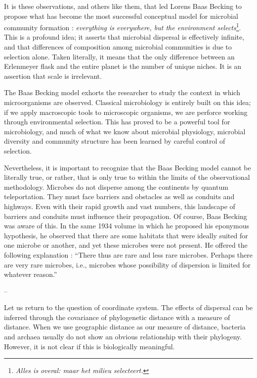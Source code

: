 It is these observations, and others like them, that led Lorens Baas Becking to propose what has become the most successful conceptual model for microbial community formation : {\em everything is everywhere, but the environment selects}\footnote{{\em Alles is overal: maar het milieu selecteert.}}. This is a profound idea; it asserts that microbial dispersal is effectively infinite, and that differences of composition among microbial communities is due to selection alone. Taken literally, it means that the only difference between an Erlenmeyer flask and the entire planet is the number of unique niches. It is an assertion that scale is irrelevant.

The Baas Becking model exhorts the researcher to study the context in which microorganisms are observed. Classical microbiology is entirely built on this idea; if we apply macroscopic tools to microscopic organisms, we are perforce working through environmental selection. This has proved to be a powerful tool for microbiology, and much of what we know about microbial physiology, microbial diversity and community structure has been learned by careful control of selection. 

Nevertheless, it is important to recognize that the Baas Becking model cannot be literally true, or rather, that is only true to within the limits of the observational methodology. Microbes do not disperse among the continents by quantum teleportation. They must face barriers and obstacles as well as conduits and highways. Even with their rapid growth and vast numbers, this landscape of barriers and conduits must influence their propagation. Of course, Baas Becking was aware of this. In the same 1934 volume in which he proposed his eponymous hypothesis, he observed that there are some habitats that were ideally suited for one microbe or another, and yet these microbes were not present. He offered the following explanation : ``There thus are rare and less rare microbes. Perhaps there are very rare microbes, i.e., microbes whose possibility of dispersion is limited for whatever reason.''

--

Let us return to the question of coordinate system. The effects of dispersal can be inferred through the covariance of phylogenetic distance with a measure of distance. When we use geographic distance as our measure of distance, bacteria and archaea usually do not show an obvious relationship with their phylogeny. However, it is not clear if this is biologically meaningful.

